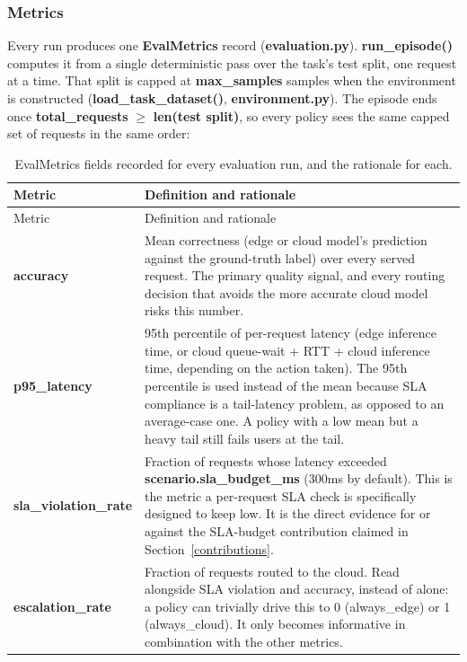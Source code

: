 \hypertarget{metrics}{%
\subsubsection{Metrics}\label{metrics}}

Every run produces one \textbf{EvalMetrics} record
(\textbf{evaluation.py}). \textbf{run\_episode()} computes it from a
single deterministic pass over the task's test split, one request at a
time. That split is capped at \textbf{max\_samples} samples when the
environment is constructed (\textbf{load\_task\_dataset()},
\textbf{environment.py}). The episode ends once
\textbf{total\_requests} $\geq$ \textbf{len(test split)}, so every
policy sees the same capped set of requests in the same order:

\begin{longtable}{p{2.7cm}p{9.8cm}}
\caption{EvalMetrics fields recorded for every evaluation run, and the rationale for each.}\label{tab:metrics}\\
\toprule
Metric & Definition and rationale \\
\midrule
\endfirsthead
\toprule
Metric & Definition and rationale \\
\midrule
\endhead
\textbf{accuracy} & Mean correctness (edge or cloud model's prediction against the ground-truth label) over every served request. The primary quality signal, and every routing decision that avoids the more accurate cloud model risks this number. \\
\textbf{p95\_latency} & 95th percentile of per-request latency (edge inference time, or cloud queue-wait + RTT + cloud inference time, depending on the action taken). The 95th percentile is used instead of the mean because SLA compliance is a tail-latency problem, as opposed to an average-case one. A policy with a low mean but a heavy tail still fails users at the tail. \\
\textbf{sla\_violation\_rate} & Fraction of requests whose latency exceeded \textbf{scenario.sla\_budget\_ms} (300ms by default). This is the metric a per-request SLA check is specifically designed to keep low. It is the direct evidence for or against the SLA-budget contribution claimed in Section~\ref{contributions}. \\
\textbf{escalation\_rate} & Fraction of requests routed to the cloud. Read alongside SLA violation and accuracy, instead of alone: a policy can trivially drive this to 0 (always\_edge) or 1 (always\_cloud). It only becomes informative in combination with the other metrics. \\

\end{longtable}
